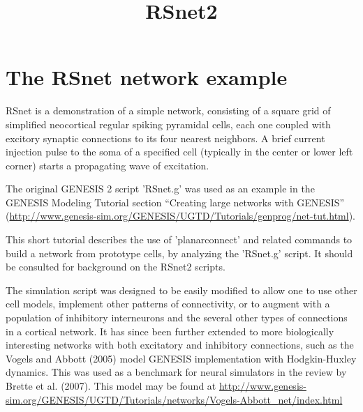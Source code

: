 \documentclass[10pt,a4paper,english]{article}
\title{RSnet2}
\author{}
\date{}
\newlength{\locallinewidth}
\begin{document}
\maketitle

\setlength{\locallinewidth}{\linewidth}



\hypertarget{the-rsnet-network-example}{}
\section*{The RSnet network example}
\label{the-rsnet-network-example}

RSnet is a demonstration of a simple network, consisting of a square grid
of simplified neocortical regular spiking pyramidal cells, each one coupled
with excitory synaptic connections to its four nearest neighbors.  A brief
current injection pulse to the soma of a specified cell (typically in the
center or lower left corner) starts a propagating wave of excitation.

The original GENESIS 2 script 'RSnet.g' was used as an example in the
GENESIS Modeling Tutorial section ``Creating large networks with GENESIS''
(\href{http://www.genesis-sim.org/GENESIS/UGTD/Tutorials/genprog/net-tut.html}{http://www.genesis-sim.org/GENESIS/UGTD/Tutorials/genprog/net-tut.html}).

This short tutorial describes the use of 'planarconnect' and related commands
to build a network from prototype cells, by analyzing the 'RSnet.g'
script.  It should be consulted for background on the RSnet2 scripts.

The simulation script was designed to be easily modified to allow one to
use other cell models, implement other patterns of connectivity, or to
augment with a population of inhibitory interneurons and the several other
types of connections in a cortical network.  It has since been further
extended to more biologically interesting networks with both excitatory and
inhibitory connections, such as the Vogels and Abbott (2005) model GENESIS
implementation with Hodgkin-Huxley dynamics. This was used as a benchmark
for neural simulators in the review by Brette et al. (2007).  This model
may be found at
\href{http://www.genesis-sim.org/GENESIS/UGTD/Tutorials/networks/Vogels-Abbott_net/index.html}{http://www.genesis-sim.org/GENESIS/UGTD/Tutorials/networks/Vogels-Abbott{\_}net/index.html}
\end{document}

